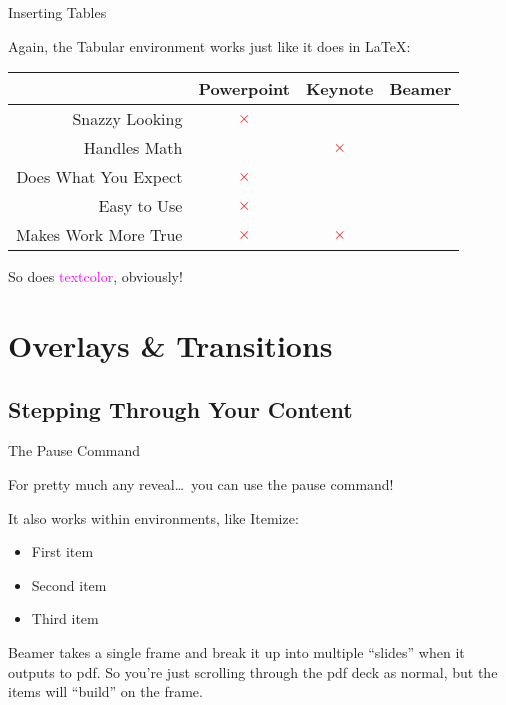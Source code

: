 \documentclass{beamer}
\begin{document}
\begin{frame}{Inserting Tables}
	
	Again, the \alert{Tabular} environment works just like it does in \LaTeX:
	
	\begin{center}
	\begin{tabular}{r | c | c | c |}
		& Powerpoint & Keynote & Beamer \\
		\hline\hline
		Snazzy Looking & \textcolor{red}{$\times$}  & \textcolor{teal}{\checkmark} & \textcolor{teal}{\checkmark} \\
		\hline
		Handles Math & \textcolor{teal}{\checkmark} & \textcolor{red}{$\times$} & \textcolor{teal}{\checkmark} \\
		\hline
		Does What You Expect & \textcolor{red}{$\times$} & \textcolor{teal}{\checkmark} & \textcolor{teal}{\checkmark} \\
		\hline
		Easy to Use & \textcolor{red}{$\times$} & \textcolor{teal}{\checkmark} & \textcolor{teal}{\checkmark} \\
		\hline
		Makes Work More True & \textcolor{red}{$\times$} & \textcolor{red}{$\times$} & \textcolor{teal}{\checkmark}\\
		\hline
	\end{tabular}
	\end{center}
	
	So does \textcolor{magenta}{textcolor}, obviously!
	
\end{frame}


\section{Overlays \& Transitions}
\subsection{Stepping Through Your Content}


\begin{frame}{The Pause Command}

	For pretty much any reveal\dots\ \pause you can use the \alert{pause} command! \pause
	
	\vfill
	
	It also works within environments, like \alert{Itemize:} \pause
	
	\begin{itemize}
		\item First item \pause
		\item Second item \pause
		\item Third item
	\end{itemize}
	
	\vfill
	
	Beamer takes a single frame and break it up into multiple ``slides'' when it outputs to pdf. So you're just scrolling through the pdf deck as normal, but the items will ``build'' on the frame.
	
\end{frame}
\end{document}
